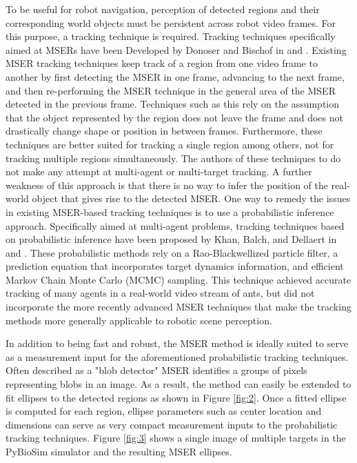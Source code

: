 \documentclass[conference]{IEEEtran}
\begin{document}
To be useful for robot navigation, perception of detected regions and their corresponding world objects must be persistent across robot video frames. For this purpose, a tracking technique is required. Tracking techniques specifically aimed at MSERs have been Developed by Donoser and Bischof in \cite{Donoser06cvpr} and \cite{Donoser10icpr}. Existing MSER tracking techniques keep track of a region from one video frame to another by first detecting the MSER in one frame, advancing to the next frame, and then re-performing the MSER technique in the general area of the MSER detected in the previous frame. Techniques such as this  rely on the assumption that the object represented by the region does not leave the frame and does not drastically change shape or position in between frames. Furthermore, these techniques are better suited for tracking a single region among others, not for tracking multiple regions simultaneously. The authors of these techniques to do not make any attempt at multi-agent or multi-target tracking. A further weakness of this approach is that there is no way to infer the position of the real-world object that gives rise to the detected MSER. One way to remedy the issues in existing MSER-based tracking techniques is to use a probabilistic inference approach. Specifically aimed at multi-agent problems, tracking techniques based on probabilistic inference have been proposed by Khan, Balch, and Dellaert in \cite{Khan06pami} and \cite{Khan05cvpr}. These probabilistic methods rely on a Rao-Blackwellized particle filter, a prediction equation that incorporates target dynamics information, and efficient Markov Chain Monte Carlo (MCMC) sampling. This technique achieved accurate tracking of many agents in a real-world video stream of ants, but did not incorporate the more recently advanced MSER techniques that make the tracking methods more generally applicable to robotic scene perception.  

In addition to being fast and robust, the MSER method is ideally suited to serve as a measurement input for the aforementioned probabilistic tracking techniques. Often described as a "blob detector" MSER identifies a groups  of pixels representing blobs in an image. As a result, the method can easily be extended to fit ellipses to the detected regions as shown in Figure \ref{fig:2}. Once a fitted ellipse is computed for each region, ellipse parameters such as center location and dimensions can serve as very compact measurement inputs to the probabilistic tracking techniques. Figure \ref{fig:3} shows a single image of multiple targets in the PyBioSim simulator and the resulting MSER ellipses.
\end{document}
